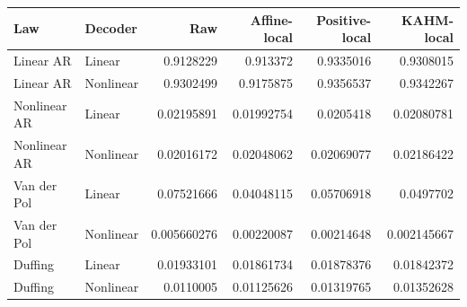 \begin{tabular}{llrrrr}
\toprule
Law & Decoder & Raw & Affine-local & Positive-local & KAHM-local \\
\midrule
Linear AR & Linear & 0.9128229 & 0.913372 & 0.9335016 & 0.9308015 \\
Linear AR & Nonlinear & 0.9302499 & 0.9175875 & 0.9356537 & 0.9342267 \\
Nonlinear AR & Linear & 0.02195891 & 0.01992754 & 0.0205418 & 0.02080781 \\
Nonlinear AR & Nonlinear & 0.02016172 & 0.02048062 & 0.02069077 & 0.02186422 \\
Van der Pol & Linear & 0.07521666 & 0.04048115 & 0.05706918 & 0.0497702 \\
Van der Pol & Nonlinear & 0.005660276 & 0.00220087 & 0.00214648 & 0.002145667 \\
Duffing & Linear & 0.01933101 & 0.01861734 & 0.01878376 & 0.01842372 \\
Duffing & Nonlinear & 0.0110005 & 0.01125626 & 0.01319765 & 0.01352628 \\
\bottomrule
\end{tabular}
